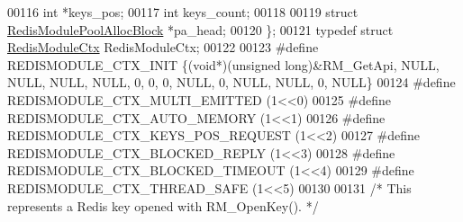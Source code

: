 \begin{DoxyCode}
00116     \textcolor{keywordtype}{int} *keys\_pos;
00117     \textcolor{keywordtype}{int} keys\_count;
00118 
00119     \textcolor{keyword}{struct} \hyperlink{structRedisModulePoolAllocBlock}{RedisModulePoolAllocBlock} *pa\_head;
00120 \};
00121 \textcolor{keyword}{typedef} \textcolor{keyword}{struct} \hyperlink{structRedisModuleCtx}{RedisModuleCtx} RedisModuleCtx;
00122 
00123 \textcolor{preprocessor}{#}\textcolor{preprocessor}{define} \textcolor{preprocessor}{REDISMODULE\_CTX\_INIT} \textcolor{preprocessor}{\{}\textcolor{preprocessor}{(}\textcolor{keywordtype}{void}\textcolor{preprocessor}{*}\textcolor{preprocessor}{)}\textcolor{preprocessor}{(}\textcolor{keywordtype}{unsigned} \textcolor{keywordtype}{long}\textcolor{preprocessor}{)}\textcolor{preprocessor}{&}\textcolor{preprocessor}{RM\_GetApi}\textcolor{preprocessor}{,} NULL\textcolor{preprocessor}{,} NULL\textcolor{preprocessor}{,} NULL\textcolor{preprocessor}{,} NULL\textcolor{preprocessor}{,} 0\textcolor{preprocessor}{,} 0\textcolor{preprocessor}{,} 0\textcolor{preprocessor}{,} NULL\textcolor{preprocessor}{,}
       0\textcolor{preprocessor}{,} NULL\textcolor{preprocessor}{,} NULL\textcolor{preprocessor}{,} 0\textcolor{preprocessor}{,} NULL\textcolor{preprocessor}{\}}
00124 \textcolor{preprocessor}{#}\textcolor{preprocessor}{define} \textcolor{preprocessor}{REDISMODULE\_CTX\_MULTI\_EMITTED} \textcolor{preprocessor}{(}1\textcolor{preprocessor}{<<}0\textcolor{preprocessor}{)}
00125 \textcolor{preprocessor}{#}\textcolor{preprocessor}{define} \textcolor{preprocessor}{REDISMODULE\_CTX\_AUTO\_MEMORY} \textcolor{preprocessor}{(}1\textcolor{preprocessor}{<<}1\textcolor{preprocessor}{)}
00126 \textcolor{preprocessor}{#}\textcolor{preprocessor}{define} \textcolor{preprocessor}{REDISMODULE\_CTX\_KEYS\_POS\_REQUEST} \textcolor{preprocessor}{(}1\textcolor{preprocessor}{<<}2\textcolor{preprocessor}{)}
00127 \textcolor{preprocessor}{#}\textcolor{preprocessor}{define} \textcolor{preprocessor}{REDISMODULE\_CTX\_BLOCKED\_REPLY} \textcolor{preprocessor}{(}1\textcolor{preprocessor}{<<}3\textcolor{preprocessor}{)}
00128 \textcolor{preprocessor}{#}\textcolor{preprocessor}{define} \textcolor{preprocessor}{REDISMODULE\_CTX\_BLOCKED\_TIMEOUT} \textcolor{preprocessor}{(}1\textcolor{preprocessor}{<<}4\textcolor{preprocessor}{)}
00129 \textcolor{preprocessor}{#}\textcolor{preprocessor}{define} \textcolor{preprocessor}{REDISMODULE\_CTX\_THREAD\_SAFE} \textcolor{preprocessor}{(}1\textcolor{preprocessor}{<<}5\textcolor{preprocessor}{)}
00130 
00131 \textcolor{comment}{/* This represents a Redis key opened with RM\_OpenKey(). */}

\end{DoxyCode}
